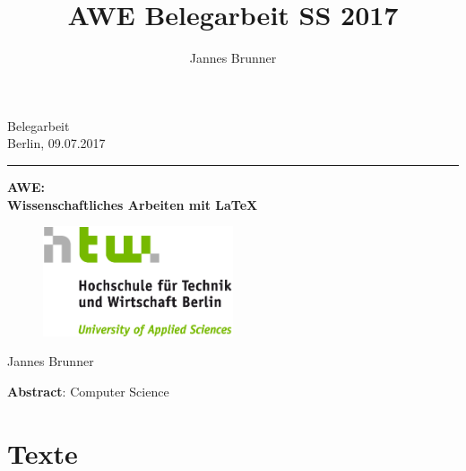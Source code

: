 \documentclass{scrreprt}
\begin{document}
\author{Jannes Brunner}
\title{AWE Belegarbeit SS 2017}

	\begin{titlepage}
		\begin{center}
			{\large Belegarbeit}\\
			{\large Berlin, 09.07.2017}
			\vspace{0.5cm} \hrule \vspace{0.6cm}
			{\huge \textbf{ AWE: \\ Wissenschaftliches Arbeiten mit LaTeX \\ }}
			\vspace{0.8cm}
			\begin{figure}[h!]
				\centering
				\includegraphics[width=0.5\textwidth]{images/HTW_Logo_rgb.png}
			\end{figure}
		
			\vspace{0.8cm}
			\large {Jannes Brunner}
		\end{center}
		\vspace{0.6cm}
		\textbf{Abstract}: Computer Science
	
		
	\end{titlepage}
	
	\tableofcontents
	
	\chapter{Texte}
	\label{cha:texte}
\end{document}
